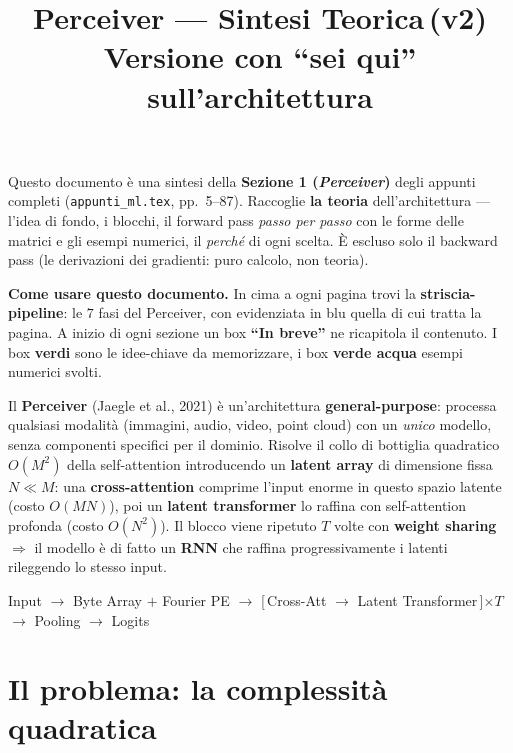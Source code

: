 \documentclass[11pt]{article}
\title{\textbf{\color{seccolor} Perceiver --- Sintesi Teorica}\,\textnormal{\Large(v2)}\\[4pt]
  \large Versione con ``sei qui'' sull'architettura}
\author{}
\date{}
\newcommand{\curstage}{0}
\newcommand{\stage}[1]{\gdef\curstage{#1}}
\begin{document}
\maketitle
\stage{0}
\vspace{-2.2em}

Questo documento è una sintesi della \textbf{Sezione 1 (\emph{Perceiver})} degli appunti completi (\texttt{appunti\_ml.tex}, pp.~5--87). Raccoglie \textbf{la teoria} dell'architettura --- l'idea di fondo, i blocchi, il forward pass \emph{passo per passo} con le forme delle matrici e gli esempi numerici, il \emph{perché} di ogni scelta. È escluso solo il backward pass (le derivazioni dei gradienti: puro calcolo, non teoria).

\begin{notabox}
\textbf{Come usare questo documento.} In cima a ogni pagina trovi la \textbf{striscia-pipeline}: le $7$ fasi del Perceiver, con evidenziata in blu quella di cui tratta la pagina. A inizio di ogni sezione un box \textbf{``In breve''} ne ricapitola il contenuto. I box \textbf{verdi} sono le idee-chiave da memorizzare, i box \textbf{verde acqua} esempi numerici svolti.
\end{notabox}

\begin{esamebox}[title={\textbf{Il Perceiver in 60 secondi}}]
Il \textbf{Perceiver} (Jaegle et al., 2021) è un'architettura \textbf{general-purpose}: processa qualsiasi modalità (immagini, audio, video, point cloud) con un \emph{unico} modello, senza componenti specifici per il dominio. Risolve il collo di bottiglia quadratico $O(M^2)$ della self-attention introducendo un \textbf{latent array} di dimensione fissa $N \ll M$: una \textbf{cross-attention} comprime l'input enorme in questo spazio latente (costo $O(MN)$), poi un \textbf{latent transformer} lo raffina con self-attention profonda (costo $O(N^2)$). Il blocco viene ripetuto $T$ volte con \textbf{weight sharing} $\Rightarrow$ il modello è di fatto un \textbf{RNN} che raffina progressivamente i latenti rileggendo lo stesso input.

\smallskip
\centering\small\ttfamily
Input $\to$ Byte Array $+$ Fourier PE $\to$ [\,Cross-Att $\to$ Latent Transformer\,]$\times T$ $\to$ Pooling $\to$ Logits
\end{esamebox}

{\small\tableofcontents}
\clearpage

\section{Il problema: la complessità quadratica}
\stage{0}
\end{document}
